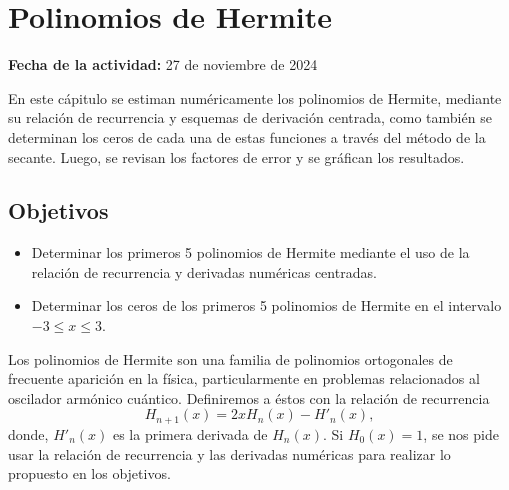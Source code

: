 \documentclass[../portafolio.tex]{subfiles}
\begin{document}
\chapter{Polinomios de Hermite}
\label{g5_ej4}
\hfill \textbf{Fecha de la actividad:} 27 de noviembre de 2024

\medskip

En este cápitulo se estiman numéricamente los polinomios de Hermite, mediante su relación de recurrencia y esquemas de derivación centrada, como también se determinan los ceros de cada una de estas funciones a través del método de la secante. Luego, se revisan los factores de error y se gráfican los resultados.

\section*{Objetivos}
\begin{itemize}
\item Determinar los primeros 5 polinomios de Hermite mediante el uso de la relación de recurrencia y derivadas numéricas centradas.
\item Determinar los ceros de los primeros 5 polinomios de Hermite en el intervalo $-3\leq x \leq 3$.
\end{itemize}
\medskip

Los polinomios de Hermite son una familia de polinomios ortogonales de frecuente aparición en la física, particularmente en problemas relacionados al oscilador armónico cuántico. Definiremos a éstos con la relación de recurrencia 
\begin{equation}
H_{n+1}(x)=2x H_n (x) - H'_n(x),
\end{equation}
donde, $H'_n(x)$ es la primera derivada de $H_n(x)$. Si $H_0 (x)=1$, se nos pide usar la relación de recurrencia y las derivadas numéricas para realizar lo propuesto en los objetivos.
\end{document}
